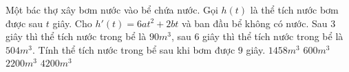 \begin{ex}%
	Một bác thợ xây bơm nước vào bể chứa nước. Gọi $h\left( t \right)$ là thể tích nước bơm được sau $t$ giây. Cho ${h}'\left( t \right)=6at^2+2bt$ và ban đầu bể không có nước. Sau 3 giây thì thể tích nước trong bể là $90m^3$, sau $6$ giây thì thể tích nước trong bể là $504m^3$. Tính thể tích nước trong bể sau khi bơm được $9$ giây.
	\choice
	{\True $1458m^3$}
	{$600m^3$}
	{$2200m^3$}
	{$4200m^3$}
\end{ex}
